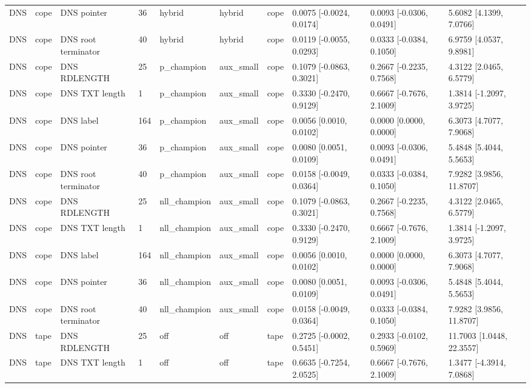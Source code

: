 \begin{tabular}{llllllllll}
DNS & cope & DNS pointer & 36 & hybrid & hybrid & cope & 0.0075 [-0.0024, 0.0174] & 0.0093 [-0.0306, 0.0491] & 5.6082 [4.1399, 7.0766] \\
DNS & cope & DNS root terminator & 40 & hybrid & hybrid & cope & 0.0119 [-0.0055, 0.0293] & 0.0333 [-0.0384, 0.1050] & 6.9759 [4.0537, 9.8981] \\
DNS & cope & DNS RDLENGTH & 25 & p\_champion & aux\_small & cope & 0.1079 [-0.0863, 0.3021] & 0.2667 [-0.2235, 0.7568] & 4.3122 [2.0465, 6.5779] \\
DNS & cope & DNS TXT length & 1 & p\_champion & aux\_small & cope & 0.3330 [-0.2470, 0.9129] & 0.6667 [-0.7676, 2.1009] & 1.3814 [-1.2097, 3.9725] \\
DNS & cope & DNS label & 164 & p\_champion & aux\_small & cope & 0.0056 [0.0010, 0.0102] & 0.0000 [0.0000, 0.0000] & 6.3073 [4.7077, 7.9068] \\
DNS & cope & DNS pointer & 36 & p\_champion & aux\_small & cope & 0.0080 [0.0051, 0.0109] & 0.0093 [-0.0306, 0.0491] & 5.4848 [5.4044, 5.5653] \\
DNS & cope & DNS root terminator & 40 & p\_champion & aux\_small & cope & 0.0158 [-0.0049, 0.0364] & 0.0333 [-0.0384, 0.1050] & 7.9282 [3.9856, 11.8707] \\
DNS & cope & DNS RDLENGTH & 25 & nll\_champion & aux\_small & cope & 0.1079 [-0.0863, 0.3021] & 0.2667 [-0.2235, 0.7568] & 4.3122 [2.0465, 6.5779] \\
DNS & cope & DNS TXT length & 1 & nll\_champion & aux\_small & cope & 0.3330 [-0.2470, 0.9129] & 0.6667 [-0.7676, 2.1009] & 1.3814 [-1.2097, 3.9725] \\
DNS & cope & DNS label & 164 & nll\_champion & aux\_small & cope & 0.0056 [0.0010, 0.0102] & 0.0000 [0.0000, 0.0000] & 6.3073 [4.7077, 7.9068] \\
DNS & cope & DNS pointer & 36 & nll\_champion & aux\_small & cope & 0.0080 [0.0051, 0.0109] & 0.0093 [-0.0306, 0.0491] & 5.4848 [5.4044, 5.5653] \\
DNS & cope & DNS root terminator & 40 & nll\_champion & aux\_small & cope & 0.0158 [-0.0049, 0.0364] & 0.0333 [-0.0384, 0.1050] & 7.9282 [3.9856, 11.8707] \\
DNS & tape & DNS RDLENGTH & 25 & off & off & tape & 0.2725 [-0.0002, 0.5451] & 0.2933 [-0.0102, 0.5969] & 11.7003 [1.0448, 22.3557] \\
DNS & tape & DNS TXT length & 1 & off & off & tape & 0.6635 [-0.7254, 2.0525] & 0.6667 [-0.7676, 2.1009] & 1.3477 [-4.3914, 7.0868] \\

\end{tabular}
